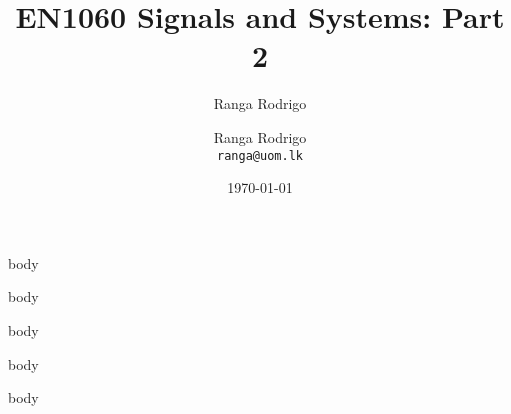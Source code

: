 \documentclass[t, aspectratio=169,xcolor={svgnames}, 10pt, handout]{beamer}
\title{EN1060 Signals and Systems: Part 2}
\author{Ranga Rodrigo}
\author[]{Ranga Rodrigo\\ \texttt{ranga@uom.lk}}
\institute[]{The University of Moratuwa, Sri Lanka}
\date{\today}
\begin{document}
    \begin{frame}
        \titlepage
    \end{frame}










    {body}


    {body}

    {body}



    {body}

    {body}


\end{document}
